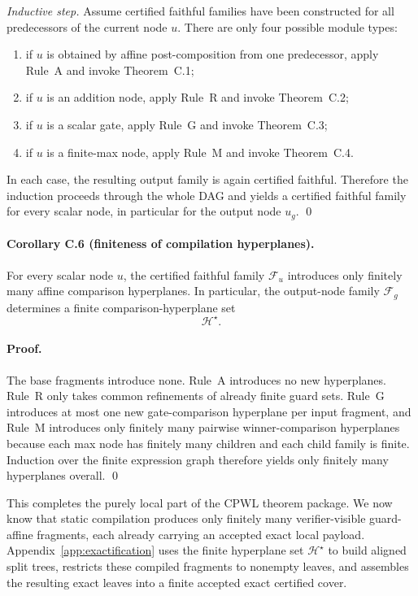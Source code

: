 \emph{Inductive step.}
Assume certified faithful families have been constructed for all predecessors of the current node $u$. There are only four possible module types:
\begin{enumerate}
    \item if $u$ is obtained by affine post-composition from one predecessor, apply Rule~A and invoke Theorem~C.1;
    \item if $u$ is an addition node, apply Rule~R and invoke Theorem~C.2;
    \item if $u$ is a scalar gate, apply Rule~G and invoke Theorem~C.3;
    \item if $u$ is a finite-max node, apply Rule~M and invoke Theorem~C.4.
\end{enumerate}
In each case, the resulting output family is again certified faithful. Therefore the induction proceeds through the whole DAG and yields a certified faithful family for every scalar node, in particular for the output node $u_g$. \qed

\paragraph{Corollary C.6 (finiteness of compilation hyperplanes).}
For every scalar node $u$, the certified faithful family $\mathcal F_u$ introduces only finitely many affine comparison hyperplanes. In particular, the output-node family $\mathcal F_g$ determines a finite comparison-hyperplane set
\[
 \mathcal H^\star.
\]

\paragraph{Proof.}
The base fragments introduce none. Rule~A introduces no new hyperplanes. Rule~R only takes common refinements of already finite guard sets. Rule~G introduces at most one new gate-comparison hyperplane per input fragment, and Rule~M introduces only finitely many pairwise winner-comparison hyperplanes because each max node has finitely many children and each child family is finite. Induction over the finite expression graph therefore yields only finitely many hyperplanes overall. \qed

This completes the purely local part of the CPWL theorem package. We now know that static compilation produces only finitely many verifier-visible guard-affine fragments, each already carrying an accepted exact local payload. Appendix~\ref{app:exactification} uses the finite hyperplane set $\mathcal H^\star$ to build aligned split trees, restricts these compiled fragments to nonempty leaves, and assembles the resulting exact leaves into a finite accepted exact certified cover.
